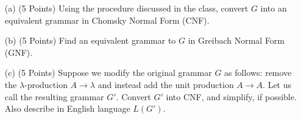 \documentclass[12pt]{article}
\begin{document}
\begin{spacing}{1.5}
\begin{enumerate}
                  \begin{enumerate}
                        \item[(a)] (5 Points) Using the procedure discussed in the class, convert $G$ into an equivalent grammar in Chomsky Normal Form (CNF).


                        \item[(b)] (5 Points) Find an equivalent grammar to $G$ in Greibach Normal Form (GNF).


                        \item[(c)] (5 Points) Suppose we modify the original grammar $G$ as follows: remove the $\lambda \text{-production}$ $A \rightarrow \lambda$ and instead add the unit production $A \rightarrow A$. Let us call the resulting grammar $G'$. Convert $G'$ into CNF, and simplify, if possible. Also describe in English language $L(G')$.


                  \end{enumerate}

      \end{enumerate}

\end{spacing}
\end{document}
